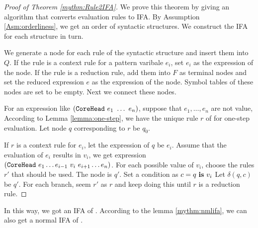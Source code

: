 \begin{proof}[Proof of Theorem \ref{mythm:Rule2IFA}]

    We prove this theorem by giving an algorithm that converts evaluation rules to IFA. By Assumption \ref{Asm:orderliness}, we get an order of syntactic structures. We construct the IFA for each structure in turn.

    We generate a node for each rule of the syntactic structure  and insert them into $Q$. If the rule is a context rule for a pattern varibale $e_i$, set $e_i$ as the expression of the node. If the rule is a reduction rule, add them into $F$ as terminal nodes and set the reduced expression $e$ as the expression of the node. Symbol tables of these nodes are set to be empty. Next we connect these nodes.

    For an expression like $(\mbox{\tt CoreHead}~e_1~\ldots~e_n)$, suppose that $e_1, \ldots, e_n$ are not value, According to Lemma \ref{lemma:one-step}, we have the unique rule $r$ of  for one-step evaluation. Let node $q$ corresponding to $r$ be $q_0$.

    If $r$ is a context rule for $e_i$, let the expression of $q$ be $e_i$. Assume that the evaluation of $e_i$ results in $v_i$, we get expression $(\mbox{\tt CoreHead}~e_1 \ldots e_{i-1}~v_i~e_{i+1} \ldots e_n)$. For each possible value of $v_i$, choose the rules $r'$ that should be used. The node is $q'$. Set a condition as $c=q~\mbox{\rm \bf is}~v_i$ Let $\delta(q, c)$ be $q'$. For each branch, seem $r'$ as $r$ and keep doing this until $r$ is a reduction rule.
\end{proof}

In this way, we got an IFA of . According to the lemma \ref{mythm:nmlifa}, we can also get a normal IFA of .

